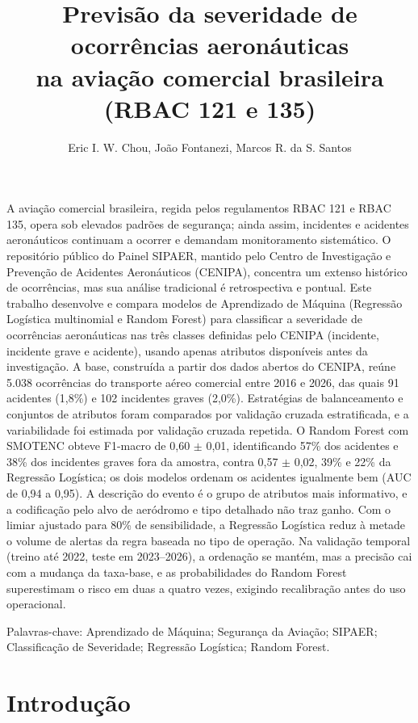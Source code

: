\documentclass[12pt]{article}
\title{Previsão da severidade de ocorrências aeronáuticas \\ na aviação comercial brasileira (RBAC 121 e 135)}
\author{Eric I. W. Chou, João Fontanezi, Marcos R. da S. Santos}
\begin{document}
\maketitle

\begin{resumo}
A aviação comercial brasileira, regida pelos regulamentos RBAC 121 e RBAC 135, opera sob elevados padrões de segurança; ainda assim, incidentes e acidentes aeronáuticos continuam a ocorrer e demandam monitoramento sistemático. O repositório público do Painel SIPAER, mantido pelo Centro de Investigação e Prevenção de Acidentes Aeronáuticos (CENIPA), concentra um extenso histórico de ocorrências, mas sua análise tradicional é retrospectiva e pontual. Este trabalho desenvolve e compara modelos de Aprendizado de Máquina (Regressão Logística multinomial e Random Forest) para classificar a severidade de ocorrências aeronáuticas nas três classes definidas pelo CENIPA (incidente, incidente grave e acidente), usando apenas atributos disponíveis antes da investigação. A base, construída a partir dos dados abertos do CENIPA, reúne 5.038 ocorrências do transporte aéreo comercial entre 2016 e 2026, das quais 91 acidentes (1,8\%) e 102 incidentes graves (2,0\%). Estratégias de balanceamento e conjuntos de atributos foram comparados por validação cruzada estratificada, e a variabilidade foi estimada por validação cruzada repetida. O Random Forest com SMOTENC obteve F1-macro de 0,60 $\pm$ 0,01, identificando 57\% dos acidentes e 38\% dos incidentes graves fora da amostra, contra 0,57 $\pm$ 0,02, 39\% e 22\% da Regressão Logística; os dois modelos ordenam os acidentes igualmente bem (AUC de 0,94 a 0,95). A descrição do evento é o grupo de atributos mais informativo, e a codificação pelo alvo de aeródromo e tipo detalhado não traz ganho. Com o limiar ajustado para 80\% de sensibilidade, a Regressão Logística reduz à metade o volume de alertas da regra baseada no tipo de operação. Na validação temporal (treino até 2022, teste em 2023--2026), a ordenação se mantém, mas a precisão cai com a mudança da taxa-base, e as probabilidades do Random Forest superestimam o risco em duas a quatro vezes, exigindo recalibração antes do uso operacional.

\noindent Palavras-chave: Aprendizado de Máquina; Segurança da Aviação; SIPAER; Classificação de Severidade; Regressão Logística; Random Forest.
\end{resumo}

\section{Introdução}
\label{sec:intro}
\end{document}
